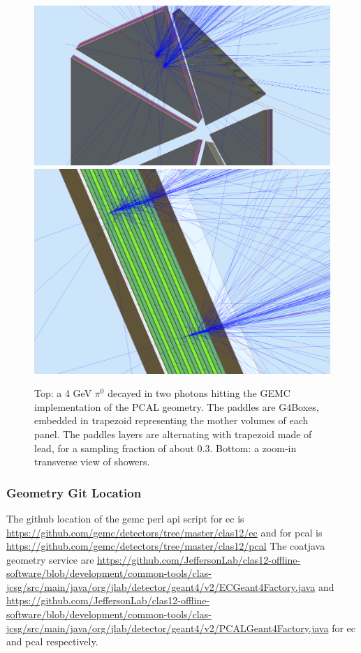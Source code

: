 \begin{figure}
	\centering
	\includegraphics[width=0.95\columnwidth,keepaspectratio]{img/pcalGeometry.png}
	\includegraphics[width=0.95\columnwidth,keepaspectratio]{img/pcalDetail.png}
	\caption{Top: a 4 GeV $\pi^0$ decayed in two photons hitting the GEMC implementation of the PCAL geometry.
            The paddles are G4Boxes, embedded in trapezoid representing the mother volumes of each panel.
            The paddles layers are alternating with trapezoid made of lead, for a sampling fraction of about 0.3.
            Bottom: a zoom-in transverse view of showers.}
	\label{fig:ecGeometry}
\end{figure}




\subsubsection{Geometry Git Location}
The github location of the gemc perl api script for ec is \url{https://github.com/gemc/detectors/tree/master/clas12/ec} and
for pcal is \url{https://github.com/gemc/detectors/tree/master/clas12/pcal}
The coatjava geometry service are
\url{https://github.com/JeffersonLab/clas12-offline-software/blob/development/common-tools/clas-jcsg/src/main/java/org/jlab/detector/geant4/v2/ECGeant4Factory.java} and
\url{https://github.com/JeffersonLab/clas12-offline-software/blob/development/common-tools/clas-jcsg/src/main/java/org/jlab/detector/geant4/v2/PCALGeant4Factory.java} for
ec and pcal respectively.



